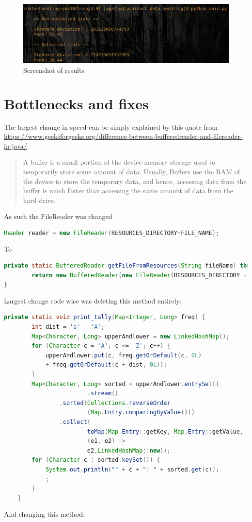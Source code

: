 \documentclass[a4paper, 12pt]{report}
\begin{document}
\begin{figure}[ht]
\centering
\includegraphics[width=12cm]{../resources/results_screenshot.png}
\caption{Screenshot of results}
\label{trash}
\label{praise kek}
\end{figure}


\chapter{Bottlenecks and fixes}

The largest change in speed can be simply explained by this quote from 
\url{https://www.geeksforgeeks.org/difference-between-bufferedreader-and-filereader-in-java/}:

\begin{quote}
A buffer is a small portion of the device memory storage used to temporarily store some amount of data. Usually, Buffers use the RAM of the device to store the temporary data, and hence, accessing data from the buffer is much faster than accessing the same amount of data from the hard drive. 
\end{quote}

As such the FileReader was changed

\begin{lstlisting}[language=java]
Reader reader = new FileReader(RESOURCES_DIRECTORY+FILE_NAME);
\end{lstlisting}

To

\begin{lstlisting}[language=java]
private static BufferedReader getFileFromResources(String fileName) throws FileNotFoundException {
		return new BufferedReader(new FileReader(RESOURCES_DIRECTORY + fileName));
}
\end{lstlisting}

Largest change code wise was deleting this method entirely:

\begin{lstlisting}[language=java]
private static void print_tally(Map<Integer, Long> freq) {
        int dist = 'a' - 'A';
        Map<Character, Long> upperAndlower = new LinkedHashMap();
        for (Character c = 'A'; c <= 'Z'; c++) {
            upperAndlower.put(c, freq.getOrDefault(c, 0L) 
            + freq.getOrDefault(c + dist, 0L));
        }
        Map<Character, Long> sorted = upperAndlower.entrySet()
        				.stream()
                .sorted(Collections.reverseOrder
                		(Map.Entry.comparingByValue()))
                .collect(
                		toMap(Map.Entry::getKey, Map.Entry::getValue, 
                		(e1, e2) -> 
                		e2,LinkedHashMap::new));
        for (Character c : sorted.keySet()) {
            System.out.println("" + c + ": " + sorted.get(c));
            ;
        }
    }
\end{lstlisting}
\newpage
And changing this method:
\end{document}

